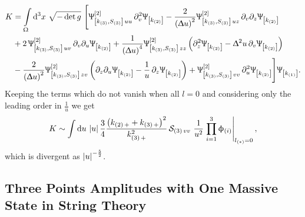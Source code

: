 \begin{equation}
  \begin{split}
    K
    & =
    \int\limits_{\Omega} \dd[3]{x}\,
    \sqrt{-\det g}~
    \Biggl[
      \Psi^{[2]}_{\qty[k_{\qty(3)}, S_{\qty(3)}]\, u u }\,
      \ipd{v}^2 \Psi_{ \qty[k_{\qty(2)}] }
      -
      \frac{2}{ \qty(\Delta u)^2 }
      \Psi^{[2]}_{\qty[k_{\qty(3)}, S_{\qty(3)}]\, u z }\,
      \ipd{v} \ipd{z} \Psi_{ \qty[k_{\qty(2)}] }
      \\
      & +
      2\, \Psi^{[2]}_{\qty[k_{\qty(3)}, S_{\qty(3)}]\, u v }\,
      \ipd{v} \ipd{u} \Psi_{ \qty[k_{\qty(2)}] }
      +
      \frac{1}{ \qty(\Delta u)^4 }
      \Psi^{[2]}_{\qty[k_{\qty(3)}, S_{\qty(3)}]\, z z }\,
      \qty(%
        \ipd{z}^2 \Psi_{ \qty[k_{\qty(2)}] }
        -
        \Delta^2 u\, \ipd{v} \Psi_{ \qty[k_{\qty(2)}] }
      ) 
      \\
      & -
      \frac{2}{ \qty(\Delta u)^2 }
      \Psi^{[2]}_{\qty[k_{\qty(3)}, S_{\qty(3)}]\, z v }\,
      \qty(%
        \ipd{z} \ipd{u} \Psi_{ \qty[k_{\qty(2)}] }
        -
        \frac{1}{u}\, \ipd{z} \Psi_{\qty[k_{\qty(2)}] }
      )
      +
      \Psi^{[2]}_{\qty[k_{\qty(3)}, S_{\qty(3)}]\, v v }\,
      \ipd{u}^2 \Psi_{ \qty[k_{\qty(2)}] }
    \Biggr]
    \Psi_{ \qty[k_{\qty(1)}] }.
  \end{split}
\end{equation}
Keeping the terms which do not vanish when all $l = 0$ and considering only the leading order in $\frac{1}{u}$ we get
\begin{equation}
  K
  \sim
  \int \dd{u}\, \abs{u}\,
  \frac{3}{4}
  \frac{\qty(k_{\qty(2)\, +} + k_{\qty(3)\, +})^2}{k_{\qty(3)\, +}^2}\,
  \cS_{\qty(3)\, v v}~
  \frac{1}{u^2}
  \eval{\finiteprod{i}{1}{3} \phi_{\qty(i)}}_{l_{\qty(*)} = 0},
  \label{eq:divergence_overlap_spin2}
\end{equation}
which is divergent as $\abs{u}^{-\frac{5}{2}}$.


\subsection{Three Points Amplitudes with One Massive State in String Theory}
\label{sec:NO3ptsMassive}


